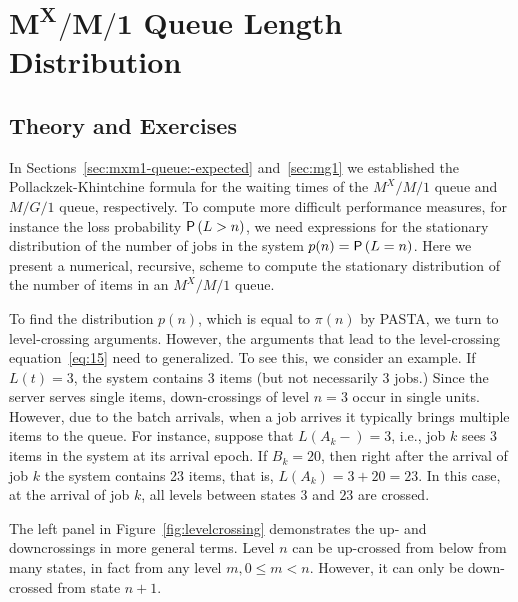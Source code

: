 \section
[$M^X/M/1$ Queue Length Distribution]
{$\mathbf{M^X/M/1}$ Queue Length Distribution}
\label{sec:batch-arrivals}


\subsection*{Theory and Exercises}


In Sections~\ref{sec:mxm1-queue:-expected} and~\ref{sec:mg1} we established the Pollackzek-Khintchine formula for the waiting times of the $M^X/M/1$ queue and $M/G/1$ queue, respectively. To compute more difficult performance measures, for instance the loss
probability $\P{L>n}$, we need expressions for the stationary distribution of the number of jobs in the system $p(n)=\P{L=n}$.   Here we present a numerical, recursive, scheme to compute the stationary distribution of the number of items in an $M^X/M/1$ queue. 

To find the distribution $p(n)$, which is equal to $\pi(n)$ by PASTA,
we turn to level-crossing arguments. However, the arguments that lead
to the level-crossing equation~\eqref{eq:15} need to generalized.  To
see this, we consider an example.  If $L(t)=3$, the system contains
$3$ items (but not necessarily $3$ jobs.)  Since the server serves
single items, down-crossings of level $n=3$ occur in single
units. However, due to the batch arrivals, when a job arrives it
typically brings multiple items to the queue. For instance, suppose
that $L(A_k-) = 3$, i.e., job $k$ sees 3 items in the system at its
arrival epoch.  If $B_k = 20$, then  right
after the arrival of job $k$ the system contains 23 items, that is, $L(A_k)=3+20=23$. In this
case, at the arrival of job $k$, all levels between states $3$ and
$23$ are crossed.  

The left panel in Figure~\ref{fig:levelcrossing} demonstrates the up- and downcrossings in more general terms.  Level $n$ can be up-crossed
from below from many states, in fact from any level $m, 0\leq m <n$. However,
it can only be down-crossed from state $n+1$.



